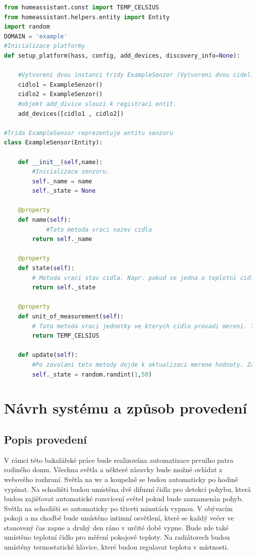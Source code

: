 \documentclass[a4paper,12pt,czech,bibliography=totoc]{scrbook}
\begin{document}
\begin{lstlisting}[language=Python]
from homeassistant.const import TEMP_CELSIUS
from homeassistant.helpers.entity import Entity
import random
DOMAIN = 'example'
#Inicializace platformy
def setup_platform(hass, config, add_devices, discovery_info=None):

	#Vytvoreni dvou instanci tridy ExampleSenzor (Vytvoreni dvou cidel)
	cidlo1 = ExampleSenzor()
	cidlo2 = ExampleSenzor()
	#objekt add_divice slouzi k registraci entit.
	add_devices([cidlo1 , cidlo2])
	
#Trida ExampleSensor reprezentuje entitu senzoru
class ExampleSensor(Entity):
		
	def __init__(self,name):
		#Inicializace senzoru.
		self._name = name
		self._state = None
	
	@property
	def name(self):
			#Tato metoda vraci nazev cidla
		return self._name

	@property
	def state(self):
		# Metoda vraci stav cidla. Napr. pokud se jedna o teplotni cidlo, tak vraci posledni namerenou hodnotu
		return self._state

	@property
	def unit_of_measurement(self):
		# Tato metoda vraci jednotky ve kterych cidlo provadi mereni. TEMP_CELSIUS je konstanta Home Assistantu
		return TEMP_CELSIUS

	def update(self):
		#Po zavolani teto metody dojde k aktualizaci merene hodnoty. Zaroven je to jedina metoda, ktera by mela ziskavat data pro Home Assistant
		self._state = random.randint(1,50)
\end{lstlisting}

\chapter{Návrh systému a způsob provedení}
\section{Popis provedení}
	V rámci této bakalářské práce bude realizována automatizace prvního patra rodiného domu. Všechna světla a některé zásuvky bude možné ovládat z webového rozhraní. Světla na wc a koupelně se budou automaticky po hodině vypínat.
	\newline
	 Na schodišti budou umístěna dvě difuzní čidla pro detekci pohybu, která budou zajišťovat automatické rozsvícení světel pokud bude zaznamenán pohyb. Světla na schodišti se automaticky po třiceti minutách vypnou.
	 \newline
	  V obývacím pokoji a na chodbě bude umístěno intimní osvětlení, které se každý večer ve stanovený čas zapne a druhý den ráno v určité době vypne. Bude zde také umístěno teplotní čidlo pro měření pokojové teploty.
	  \newline
	  Na radiátorech budou umístěny termostatické hlavice, které budou regulavat teplotu v místnosti.
\end{document}
